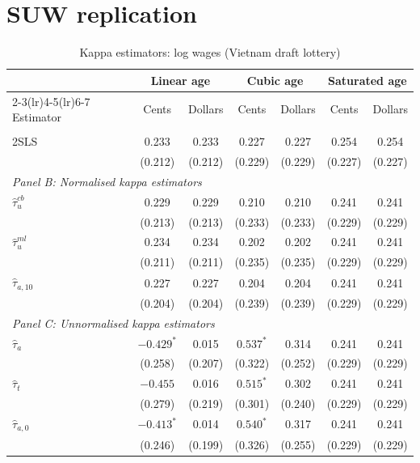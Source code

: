 \documentclass[12pt, a4paper, oneside]{article}
\theoremstyle{plain}
\theoremstyle{definition}
\begin{document}
\section{SUW replication}
\begin{table}[htbp]
\centering
\caption{Kappa estimators: log wages (Vietnam draft lottery)}
\label{tab:vietnam_kappa}
\small
\begin{tabular}{l cc cc cc}
\toprule
 & \multicolumn{2}{c}{Linear age}
 & \multicolumn{2}{c}{Cubic age}
 & \multicolumn{2}{c}{Saturated age} \\
\cmidrule(lr){2-3}\cmidrule(lr){4-5}\cmidrule(lr){6-7}
Estimator & Cents & Dollars & Cents & Dollars & Cents & Dollars \\
\midrule
\addlinespace[2pt]
\multicolumn{7}{l}{\textit{Panel A: 2SLS benchmark}} \\[2pt]
2SLS
  & 0.233      & 0.233
  & 0.227      & 0.227
  & 0.254      & 0.254      \\
  & (0.212)    & (0.212)
  & (0.229)    & (0.229)
  & (0.227)    & (0.227)    \\[4pt]
 
\multicolumn{7}{l}{\textit{Panel B: Normalised kappa estimators}} \\[2pt]
$\hat{\tau}_{u}^{cb}$
  & 0.229      & 0.229
  & 0.210      & 0.210
  & 0.241      & 0.241      \\
  & (0.213)    & (0.213)
  & (0.233)    & (0.233)
  & (0.229)    & (0.229)    \\[4pt]
$\hat{\tau}_{u}^{ml}$
  & 0.234      & 0.234
  & 0.202      & 0.202
  & 0.241      & 0.241      \\
  & (0.211)    & (0.211)
  & (0.235)    & (0.235)
  & (0.229)    & (0.229)    \\[4pt]
$\hat{\tau}_{a,10}$
  & 0.227      & 0.227
  & 0.204      & 0.204
  & 0.241      & 0.241      \\
  & (0.204)    & (0.204)
  & (0.239)    & (0.239)
  & (0.229)    & (0.229)    \\[4pt]
 
\multicolumn{7}{l}{\textit{Panel C: Unnormalised kappa estimators}} \\[2pt]
$\hat{\tau}_{a}$
  & $-0.429^{*}$  & 0.015
  & $0.537^{*}$   & 0.314
  & 0.241          & 0.241      \\
  & (0.258)        & (0.207)
  & (0.322)        & (0.252)
  & (0.229)        & (0.229)    \\[4pt]
$\hat{\tau}_{t}$
  & $-0.455$       & 0.016
  & $0.515^{*}$    & 0.302
  & 0.241          & 0.241      \\
  & (0.279)        & (0.219)
  & (0.301)        & (0.240)
  & (0.229)        & (0.229)    \\[4pt]
$\hat{\tau}_{a,0}$
  & $-0.413^{*}$   & 0.014
  & $0.540^{*}$    & 0.317
  & 0.241          & 0.241      \\
  & (0.246)        & (0.199)
  & (0.326)        & (0.255)
  & (0.229)        & (0.229)    \\
 

\end{tabular}
\end{table}
\end{document}
